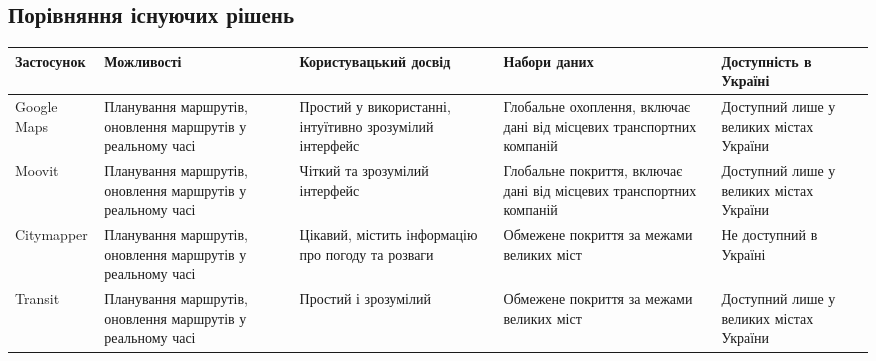 \subsection{Порівняння існуючих рішень}
\label{subsec:comparison-subsection}

\begin{centering}
\begin{tabular}{|l| p{3.5cm} | p{3.6cm} | p{2.9cm} | p{3cm} |}
\hline
\textbf{Застосунок} & \textbf{Можливості} & \textbf{Користувацький досвід} & \textbf{Набори даних} & \textbf{Доступність в Україні} \\ \hline
	Google Maps &
 	Планування маршрутів, оновлення маршрутів у реальному часі &
 	Простий у використанні, інтуїтивно зрозумілий інтерфейс &
 	Глобальне охоплення, включає дані від місцевих транспортних компаній &
 	Доступний лише у великих містах України \\ \hline
	
	Moovit &
	Планування маршрутів, оновлення маршрутів у реальному часі &
	Чіткий та зрозумілий інтерфейс &
	Глобальне покриття, включає дані від місцевих транспортних компаній &
	Доступний лише у великих містах України \\ \hline

	Citymapper &
	Планування маршрутів, оновлення маршрутів у реальному часі &
	Цікавий, містить інформацію про погоду та розваги & 
	Обмежене покриття за межами великих міст &
	Не доступний в Україні \\ \hline

	Transit &
	Планування маршрутів, оновлення маршрутів у реальному часі &
	Простий і зрозумілий &
	Обмежене покриття за межами великих міст &
	Доступний лише у великих містах України \\ \hline
\end{tabular}
\end{centering}

